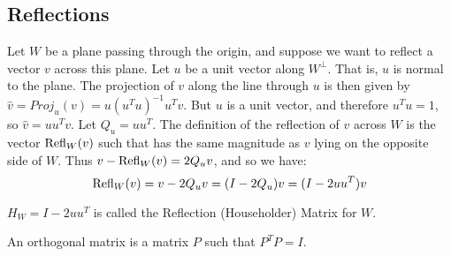 \documentclass[../main.tex]{subfiles}
\begin{document}
\subsection{Reflections}
%
{
Let $W$ be a plane passing through the origin, and suppose we want to reflect a vector $v$ across this plane. Let $u$ be a unit vector along $W^{\perp}$. That is, $u$ is normal to the plane. The projection of $v$ along the line through $u$ is then given by $\hat{v} = Proj_{u}(v) = u(u^Tu)^{-1}u^Tv$. But $u$ is a unit vector, and therefore $u^Tu = 1$, so $\hat{v} = uu^T v$. Let $Q_u = uu^T$. The definition of the reflection of $v$ across $W$ is the vector $\operatorname{Refl}_{W}(v)$ such that has the same magnitude as $v$ lying on the opposite side of $W$. Thus $v-\operatorname{Refl}_{W}(v) = 2Q_u v$, and so we have:
\begin{equation*}
    \operatorname{Refl}_{W}(v) = v-2Q_u v = (I-2Q_u)v =(I-2uu^T)v
\end{equation*}
}
%
\begin{definition}
$H_{W} = I-2uu^T$ is called the Reflection (Householder) Matrix for $W$.
\end{definition}
%
\begin{definition}
An orthogonal matrix is a matrix $P$ such that $P^TP = I$.
\end{definition}
%
\end{document}
